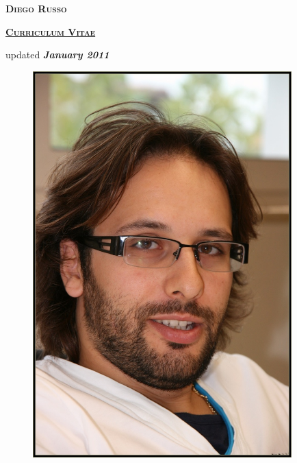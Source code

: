 \documentclass[totpages,helvetica,openbib,english]{europecv}
\begin{document}
    \begin{center}
        \hspace{1pt}
        \vspace{2cm}
    
        {\scshape \textbf{\Huge Diego Russo}}
    
        \vspace{1cm}
    
        {\scshape \textbf{\Large \underline{Curriculum Vitae}}}
    
        \vspace{0.25cm}
    
        {\large updated \emph{\textbf{January 2011}}}
        
        \vspace{2cm}
        
        \begin{figure}[htbp] 
            \begin{center} 
                \includegraphics[width=10cm]{../images/io.jpg}
            \end{center} 
        \end{figure}
        
    \end{center}
\pagebreak
{}
\end{document}
